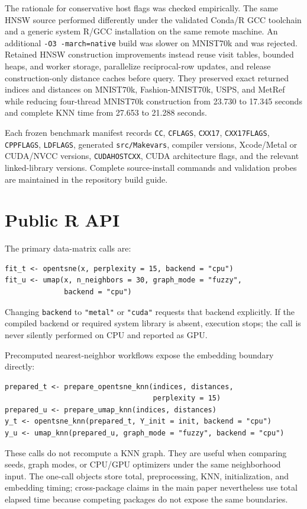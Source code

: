 \documentclass[twoside,11pt]{article}
\begin{document}
The rationale for conservative host flags was checked empirically. The same HNSW source performed differently under the validated Conda/R GCC toolchain and a generic system R/GCC installation on the same remote machine. An additional \texttt{-O3 -march=native} build was slower on MNIST70k and was rejected. Retained HNSW construction improvements instead reuse visit tables, bounded heaps, and worker storage, parallelize reciprocal-row updates, and release construction-only distance caches before query. They preserved exact returned indices and distances on MNIST70k, Fashion-MNIST70k, USPS, and MetRef while reducing four-thread MNIST70k construction from 23.730 to 17.345 seconds and complete KNN time from 27.653 to 21.288 seconds.

Each frozen benchmark manifest records \texttt{CC}, \texttt{CFLAGS}, \texttt{CXX17}, \texttt{CXX17FLAGS}, \texttt{CPPFLAGS}, \texttt{LDFLAGS}, generated \texttt{src/Makevars}, compiler versions, Xcode/Metal or CUDA/NVCC versions, \texttt{CUDAHOSTCXX}, CUDA architecture flags, and the relevant linked-library versions. Complete source-install commands and validation probes are maintained in the repository build guide.

\section{Public R API}

The primary data-matrix calls are:
\begin{verbatim}
fit_t <- opentsne(x, perplexity = 15, backend = "cpu")
fit_u <- umap(x, n_neighbors = 30, graph_mode = "fuzzy",
              backend = "cpu")
\end{verbatim}
Changing \texttt{backend} to \texttt{"metal"} or \texttt{"cuda"} requests that backend explicitly. If the compiled backend or required system library is absent, execution stops; the call is never silently performed on CPU and reported as GPU.

Precomputed nearest-neighbor workflows expose the embedding boundary directly:
\begin{verbatim}
prepared_t <- prepare_opentsne_knn(indices, distances,
                                   perplexity = 15)
prepared_u <- prepare_umap_knn(indices, distances)
y_t <- opentsne_knn(prepared_t, Y_init = init, backend = "cpu")
y_u <- umap_knn(prepared_u, graph_mode = "fuzzy", backend = "cpu")
\end{verbatim}
These calls do not recompute a KNN graph. They are useful when comparing seeds, graph modes, or CPU/GPU optimizers under the same neighborhood input. The one-call objects store total, preprocessing, KNN, initialization, and embedding timing; cross-package claims in the main paper nevertheless use total elapsed time because competing packages do not expose the same boundaries.
\end{document}
